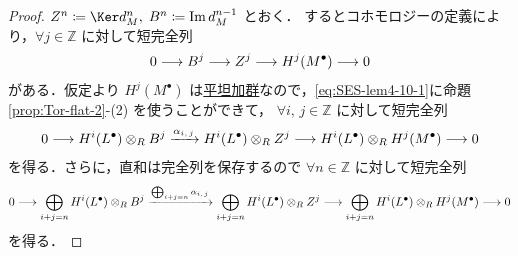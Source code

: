 \documentclass[algtopo_main]{subfiles}
\begin{document}
\begin{proof}
    $Z^n \coloneqq \Ker d_M^n,\; B^n \coloneqq \Im d_M^{n-1}$ とおく．
    するとコホモロジーの定義により，$\forall j \in \mathbb{Z}$ に対して短完全列
    \begin{align}
        \label{eq:SES-lem4-10-1}
        0 \longrightarrow B^j \longrightarrow Z^j \longrightarrow H^j(M^\bullet) \longrightarrow 0
    \end{align}
    がある．仮定より $H^j(M^\bullet)$ は\hyperref[def:flat-mod]{平坦加群}なので，\eqref{eq:SES-lem4-10-1}に命題\ref{prop:Tor-flat-2}-(2) を使うことができて，
    $\forall i,\, j \in \mathbb{Z}$ に対して短完全列
    \begin{align}
        0 \longrightarrow H^i(L^\bullet) \otimes_R B^j \xrightarrow{\alpha_{i,\, j}} H^i(L^\bullet) \otimes_R Z^j \longrightarrow H^i(L^\bullet) \otimes_R H^j(M^\bullet) \longrightarrow 0
    \end{align}
    を得る．さらに，直和は完全列を保存するので $\forall n \in \mathbb{Z}$ に対して短完全列
    \begin{align}
        \label{eq:SES-lem4-10-2}
        0 \longrightarrow \bigoplus_{i+j=n} H^i(L^\bullet) \otimes_R B^j \xrightarrow{\bigoplus_{i+j=n}\alpha_{i,\, j}} \bigoplus_{i+j=n} H^i(L^\bullet) \otimes_R Z^j \longrightarrow \bigoplus_{i+j=n} H^i(L^\bullet) \otimes_R H^j(M^\bullet) \longrightarrow 0
    \end{align}
    を得る．


\end{proof}
\end{document}

